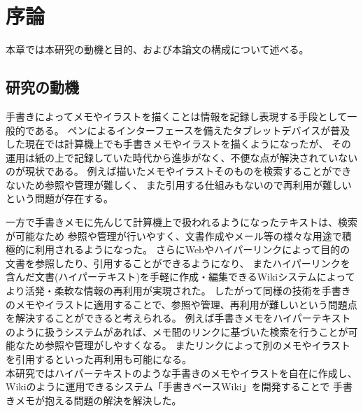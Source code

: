 \chapter{序論}
\label{chap:introduction}

本章では本研究の動機と目的、および本論文の構成について述べる。

\newpage

\section{研究の動機}
\label{douki}


手書きによってメモやイラストを描くことは情報を記録し表現する手段として一般的である。
ペンによるインターフェースを備えたタブレットデバイスが普及した現在では計算機上でも手書きメモやイラストを描くようになったが、
その運用は紙の上で記録していた時代から進歩がなく、不便な点が解決されていないのが現状である。
例えば描いたメモやイラストそのものを検索することができないため参照や管理が難しく、
また引用する仕組みもないので再利用が難しいという問題が存在する。

一方で手書きメモに先んじて計算機上で扱われるようになったテキストは、検索が可能なため
参照や管理が行いやすく、文書作成やメール等の様々な用途で積極的に利用されるようになった。
さらにWebやハイパーリンクによって目的の文書を参照したり、引用することができるようになり、
またハイパーリンクを含んだ文書(ハイパーテキスト)を手軽に作成・編集できるWikiシステムによって
より活発・柔軟な情報の再利用が実現された。
したがって同様の技術を手書きのメモやイラストに適用することで、参照や管理、再利用が難しいという問題点を解決することができると考えられる。
例えば手書きメモをハイパーテキストのように扱うシステムがあれば、メモ間のリンクに基づいた検索を行うことが可能なため参照や管理がしやすくなる。
またリンクによって別のメモやイラストを引用するといった再利用も可能になる。
\\
本研究ではハイパーテキストのような手書きのメモやイラストを自在に作成し、Wikiのように運用できるシステム「手書きベースWiki」を開発することで
手書きメモが抱える問題の解決を解決した。

